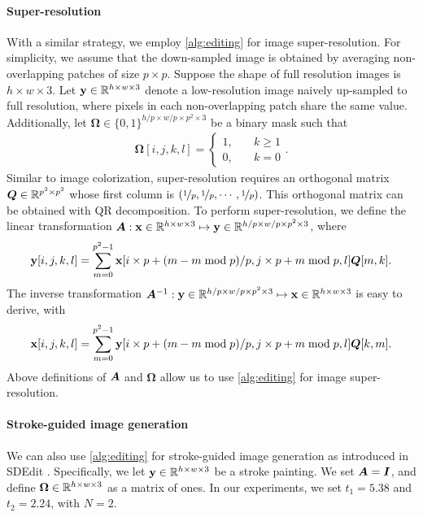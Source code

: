 \begin{appendices}
\paragraph{Super-resolution} With a similar strategy, we employ \cref{alg:editing} for image super-resolution. For simplicity, we assume that the down-sampled image is obtained by averaging non-overlapping patches of size $p\times p$. Suppose the shape of full resolution images is $h \times w \times 3$. Let ${\mathbf{y}} \in \mathbb{R}^{h\times w\times 3}$ denote a low-resolution image naively up-sampled to full resolution, where pixels in each non-overlapping patch share the same value. Additionally, let $\bm{\Omega} \in \{0, 1\}^{h/p\times w/p \times p^2 \times 3}$ be a binary mask such that
\begin{align*}
    \bm{\Omega}[i, j, k, l] = \begin{cases}
        1, &\quad k \geq 1\\
        0, &\quad k=0
    \end{cases}.
\end{align*}
Similar to image colorization, super-resolution requires an orthogonal matrix ${\bm{Q}} \in \mathbb{R}^{p^2 \times p^2}$ whose first column is $(\nicefrac{1}{p}, \nicefrac{1}{p}, \cdots, \nicefrac{1}{p})$. This orthogonal matrix can be obtained with QR decomposition. To perform super-resolution, we define the linear transformation ${\bm{A}}: {\mathbf{x}} \in \mathbb{R}^{h \times w\times 3} \mapsto {\mathbf{y}} \in \mathbb{R}^{h/p\times w/p \times p^2 \times 3}$, where
\begin{align*}
    {\mathbf{y}}[i, j, k, l] = \sum_{m=0}^{p^2-1} {\mathbf{x}}[i\times p+ (m - m\bmod p)/p, j \times p + m \bmod p, l ] {\bm{Q}}[m, k].
\end{align*}
The inverse transformation ${\bm{A}}^{-1}: {\mathbf{y}} \in \mathbb{R}^{h/p\times w/p \times p^2 \times 3} \mapsto {\mathbf{x}} \in \mathbb{R}^{h \times w\times 3}$ is easy to derive, with
\begin{align*}
    {\mathbf{x}}[i, j, k, l] = \sum_{m=0}^{p^2-1} {\mathbf{y}}[i\times p+ (m - m\bmod p)/p, j \times p + m \bmod p, l ] {\bm{Q}}[k, m].
\end{align*}
Above definitions of ${\bm{A}}$ and $\bm{\Omega}$ allow us to use \cref{alg:editing} for image super-resolution.

\paragraph{Stroke-guided image generation} We can also use \cref{alg:editing} for stroke-guided image generation as introduced in SDEdit \cite{meng2021sdedit}. Specifically, we let ${\mathbf{y}} \in \mathbb{R}^{h\times w \times 3}$ be a stroke painting. We set ${\bm{A}} = {\bm{I}}$, and define $\bm{\Omega}\in \mathbb{R}^{h\times w \times 3}$ as a matrix of ones. In our experiments, we set $t_1 = 5.38$ and $t_2 = 2.24$, with $N=2$.


\end{appendices}
